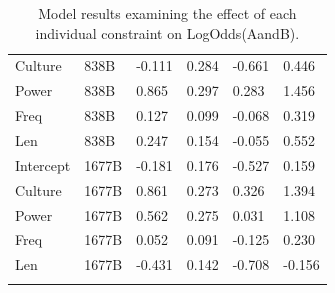 \documentclass[
  nottoc]{article}
\begin{document}
\begin{longtable}[]{@{}llllll@{}}
Culture & 838B & -0.111 & 0.284 & -0.661 & 0.446 \\
Power & 838B & 0.865 & 0.297 & 0.283 & 1.456 \\
Freq & 838B & 0.127 & 0.099 & -0.068 & 0.319 \\
Len & 838B & 0.247 & 0.154 & -0.055 & 0.552 \\
Intercept & 1677B & -0.181 & 0.176 & -0.527 & 0.159 \\
Culture & 1677B & 0.861 & 0.273 & 0.326 & 1.394 \\
Power & 1677B & 0.562 & 0.275 & 0.031 & 1.108 \\
Freq & 1677B & 0.052 & 0.091 & -0.125 & 0.230 \\
Len & 1677B & -0.431 & 0.142 & -0.708 & -0.156 \\


\caption{\label{tbl-exp2m2}Model results examining the effect of each
individual constraint on LogOdds(AandB).}

\tabularnewline
\end{longtable}
\end{document}
